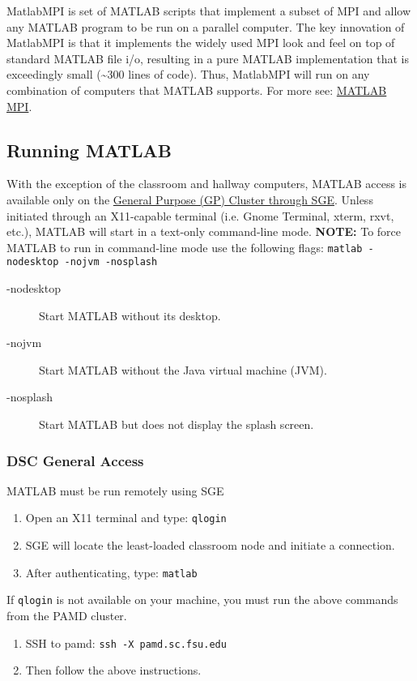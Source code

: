 \documentclass[12pt,a4paper]{article}
\begin{document}
MatlabMPI is set of MATLAB scripts that implement a subset of MPI and allow any MATLAB program to be run on a parallel computer. The key innovation of MatlabMPI is that it implements the widely used MPI look and feel on top of standard MATLAB file i/o, resulting in a pure MATLAB implementation that is exceedingly small (\textasciitilde{}300 lines of code). Thus, MatlabMPI will run on any combination of computers that MATLAB supports. For more see: \href{http://www.ll.mit.edu/mission/isr/matlabmpi.html}{MATLAB MPI}.

\subsection*{Running MATLAB}
With the exception of the classroom and hallway computers, MATLAB access is available only on the \href{https://www.sc.fsu.edu/systems/general-purpose-cluster.php}{General Purpose (GP) Cluster through SGE}. Unless initiated through an X11-capable terminal (i.e. Gnome Terminal, xterm, rxvt, etc.), MATLAB will start in a text-only command-line mode.
\textbf{NOTE:} To force MATLAB to run in command-line mode use the following flags: \texttt{matlab -nodesktop -nojvm -nosplash}
\begin{description}
    \item[-nodesktop] Start MATLAB without its desktop.
    \item[-nojvm] Start MATLAB without the Java virtual machine (JVM).
    \item[-nosplash] Start MATLAB but does not display the splash screen.
\end{description}
\subsubsection*{DSC General Access}
MATLAB must be run remotely using SGE
\begin{enumerate}
    \item Open an X11 terminal and type: \texttt{qlogin}
    \item SGE will locate the least-loaded classroom node and initiate a connection.
    \item After authenticating, type: \texttt{matlab}
\end{enumerate}
If \texttt{qlogin} is not available on your machine, you must run the above commands from the PAMD cluster.
\begin{enumerate}
    \item SSH to pamd: \texttt{ssh -X pamd.sc.fsu.edu}
    \item Then follow the above instructions.
\end{enumerate}
\end{document}
